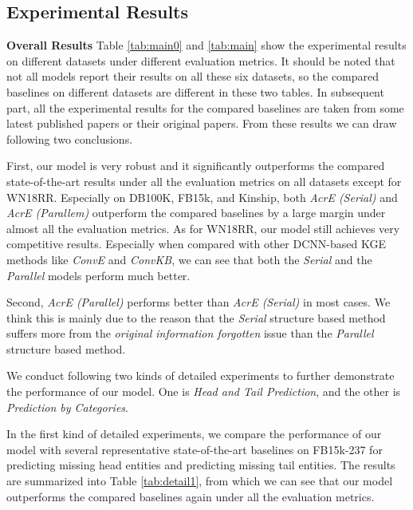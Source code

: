 \documentclass[11pt]{article}
\begin{document}
\subsection{Experimental Results}
\textbf{Overall Results} Table \ref{tab:main0} and \ref{tab:main}  show the experimental results on different datasets under different evaluation metrics. It should be noted that not all models report their results on all these six datasets, so  the compared  baselines on different datasets are different in these two tables. In subsequent part, all the experimental results for the  compared baselines  are taken from some latest published papers or their original papers. 
From these results we can draw following two conclusions. 

First,  our model is very robust and it significantly outperforms the compared state-of-the-art results under all  the evaluation metrics on all datasets  except for {WN18RR}. Especially on DB100K, FB15k, and Kinship, both \emph{AcrE (Serial)} and \emph{AcrE (Parallem)} outperform the compared baselines by a large margin under almost all the evaluation metrics.  As for WN18RR, our model still achieves very competitive results. Especially when compared with other DCNN-based KGE methods like \emph{ConvE} and \emph{ConvKB}, we can see that both the {\em Serial} and the \emph{Parallel} models perform much better. 


Second, \emph{AcrE (Parallel)} performs  better than  \emph{AcrE (Serial)} in most  cases. We think this is mainly due to the reason that the \emph{Serial} structure based method suffers more from the \emph{original information forgotten} issue than the \emph{Parallel} structure based method.







We  conduct following two kinds of detailed experiments to further demonstrate the performance of our model. One is \emph{Head and Tail Prediction}, and the other is \emph{Prediction by Categories}.  

In the first kind of detailed experiments,  we  compare the performance of our model with several representative state-of-the-art baselines on {FB15k-237} for predicting missing head entities and predicting missing tail entities.  The results are summarized into Table \ref{tab:detail1}, from which we can see that our model outperforms the compared baselines again under all the evaluation metrics.
\end{document}
